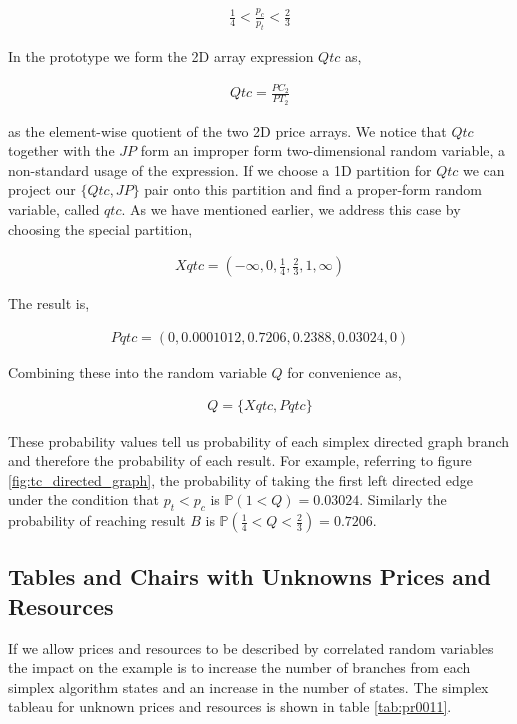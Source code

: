 \begin{align*}
\frac{1}{4} < \frac{p_c}{p_t} < \frac{2}{3}
\end{align*}

In the prototype we form the 2D array expression $Qtc$ as,

\begin{align*}
Qtc = \frac{PC_2}{PT_2}
\end{align*}

as the element-wise quotient of the two 2D price arrays. We notice
that $Qtc$ together with the $JP$ form an improper form
two-dimensional random variable, a non-standard usage of the
expression. If we choose a 1D partition for $Qtc$ we can project our
$\{Qtc, JP\}$ pair onto this partition and find a proper-form random
variable, called $qtc$. As we have mentioned earlier, we address this case by
choosing the special partition,

\begin{align*}
Xqtc = (-\infty, 0, \frac{1}{4}, \frac{2}{3}, 1, \infty)
\end{align*}

The result is,

\begin{align*}
Pqtc = (0, 0.0001012, 0.7206, 0.2388, 0.03024, 0)
\end{align*}

Combining these into the random variable $Q$ for convenience as,

\begin{align*}
Q = \{Xqtc, Pqtc\}
\end{align*}

These probability values tell us probability of each simplex directed
graph branch and therefore the probability of each result. For
example, referring to figure \ref{fig:tc_directed_graph}, the
probability of taking the first left directed edge under the condition
that $p_t < p_c$ is  $\mathbb{P}(1 < Q) = 0.03024$. Similarly the
probability of reaching result $B$ is $\mathbb{P}(\frac{1}{4} < Q <
\frac{2}{3}) = 0.7206$.

\subsection{Tables and Chairs with Unknowns Prices and Resources}

If we allow prices and resources to be described by correlated random
variables the impact on the example is to increase the number of
branches from each simplex algorithm states and an increase in the
number of states. The simplex tableau for unknown prices and resources
is shown in table \ref{tab:pr0011}. 

